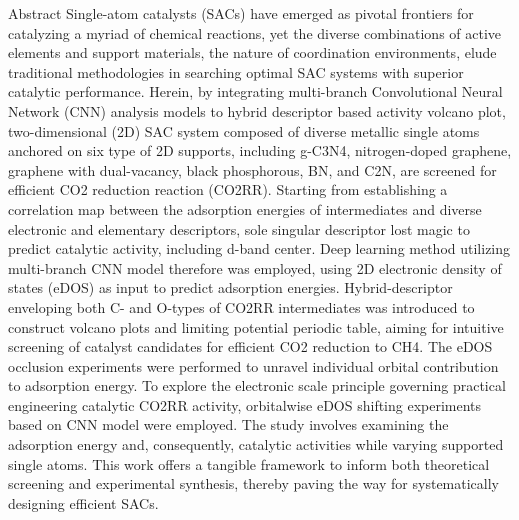 Abstract
Single-atom catalysts (SACs) have emerged as pivotal frontiers for catalyzing a myriad of chemical reactions, yet the diverse combinations of active elements and support materials, the nature of coordination environments, elude traditional methodologies in searching optimal SAC systems with superior catalytic performance. Herein, by integrating multi-branch Convolutional Neural Network (CNN) analysis models to hybrid descriptor based activity volcano plot, two-dimensional (2D) SAC system composed of diverse metallic single atoms anchored on six type of 2D supports, including g-C3N4, nitrogen-doped graphene, graphene with dual-vacancy, black phosphorous, BN, and C2N, are screened for efficient CO2 reduction reaction (CO2RR). Starting from establishing a correlation map between the adsorption energies of intermediates and diverse electronic and elementary descriptors, sole singular descriptor lost magic to predict catalytic activity, including d-band center. Deep learning method utilizing multi-branch CNN model therefore was employed, using 2D electronic density of states (eDOS) as input to predict adsorption energies. Hybrid-descriptor enveloping both C- and O-types of CO2RR intermediates was introduced to construct volcano plots and limiting potential periodic table, aiming for intuitive screening of catalyst candidates for efficient CO2 reduction to CH4. The eDOS occlusion experiments were performed to unravel individual orbital contribution to adsorption energy. To explore the electronic scale principle governing practical engineering catalytic CO2RR activity, orbitalwise eDOS shifting experiments based on CNN model were employed. The study involves examining the adsorption energy and, consequently, catalytic activities while varying supported single atoms. This work offers a tangible framework to inform both theoretical screening and experimental synthesis, thereby paving the way for systematically designing efficient SACs.
